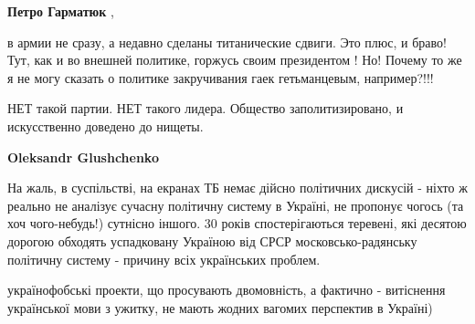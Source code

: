 \begin{itemize}
\begin{itemize}
\textbf{Петро Гарматюк} , 

в армии не сразу, а недавно сделаны титанические сдвиги. Это плюс, и браво!
Тут, как и во внешней политике, горжусь своим президентом ! Но! Почему то же я
не могу сказать о политике закручивания гаек гетьманцевым, например?!!!

\end{itemize} %


НЕТ такой партии. НЕТ такого лидера. Общество заполитизировано, и искусственно
доведено до нищеты.

\begin{itemize} %
\textbf{Oleksandr Glushchenko} 

На жаль, в суспільстві, на екранах ТБ немає дійсно політичних дискусій - ніхто
ж реально не аналізує сучасну політичну систему в Україні, не пропонує чогось
(та хоч чого-небудь!) сутнісно іншого. 30 років спостерігаються теревені, які
десятою дорогою обходять успадковану Україною від СРСР московсько-радянську
політичну систему - причину всіх українських проблем.

\end{itemize} %


українофобські проекти, що просувають двомовність, а фактично - витіснення
української мови з ужитку, не мають жодних вагомих перспектив в Україні)

\end{itemize} %
